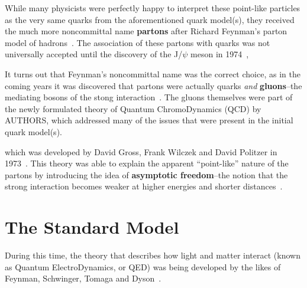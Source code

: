 While many physicists were perfectly happy to interpret these point-like particles as the very same quarks from the aforementioned quark model(s), they received the much more noncommittal name \textbf{partons} after Richard Feynman's parton model of hadrons~\cite{Partons}. The association of these partons with quarks was not universally accepted until the discovery of the J/$\psi$ meson in 1974~\cite{Jpsi}, 

It turns out that Feynman's noncommittal name was the correct choice, as in the coming years it was discovered that partons were actually quarks \textit{and} \textbf{gluons}--the mediating bosons of the stong interaction~\cite{QCDMGM}. The gluons themselves were part of the newly formulated theory of Quantum ChromoDynamics (QCD) by AUTHORS, which addressed many of the issues that were present in the initial quark model(s). 



which was developed by David Gross, Frank Wilczek and David Politzer in 1973~\cite{QCDGross, QCDWilczek, QCDPolitzer}. This theory was able to explain the apparent ``point-like'' nature of the partons by introducing the idea of \textbf{asymptotic freedom}--the notion that the strong interaction becomes weaker at higher energies and shorter distances~\cite{AsymptoticFreedom}.

\section{The Standard Model}
During this time, the theory that describes how light and matter interact (known as Quantum ElectroDynamics, or QED) was being developed by the likes of Feynman, Schwinger, Tomaga and Dyson~\cite{QEDFeymnan, QEDSchwinger, QEDTomaga, QEDDyson}. 

